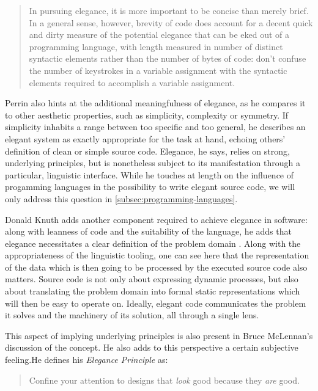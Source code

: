 \begin{quote}
  In pursuing elegance, it is more important to be concise than merely brief. In a general sense, however, brevity of code does account for a decent quick and dirty measure of the potential elegance that can be eked out of a programming language, with length measured in number of distinct syntactic elements rather than the number of bytes of code: don't confuse the number of keystrokes in a variable assignment with the syntactic elements required to accomplish a variable assignment. \citep{perrin_itlog_2006}
\end{quote}

Perrin also hints at the additional meaningfulness of elegance, as he compares it to other aesthetic properties, such as simplicity, complexity or symmetry. If simplicity inhabits a range between too specific and too general, he describes an elegant system as exactly appropriate for the task at hand, echoing others' definition of clean or simple source code. Elegance, he says, relies on strong, underlying principles, but is nonetheless subject to its manifestation through a particular, linguistic interface. While he touches at length on the influence of progamming languages in the possibility to write elegant source code, we will only address this question in \autoref{subsec:programming-languages}.

Donald Knuth adds another component required to achieve elegance in software: along with leanness of code and the suitability of the language, he adds that elegance necessitates a clear definition of the problem domain \citep{fuller_software_2008}. Along with the appropriateness of the linguistic tooling, one can see here that the representation of the data which is then going to be processed by the executed source code also matters. Source code is not only about expressing dynamic processes, but also about translating the problem domain into formal static representations which will then be easy to operate on. Ideally, elegant code communicates the problem it solves and the machinery of its solution, all through a single lens.

This aspect of implying underlying principles is also present in Bruce McLennan's discussion of the concept. He also adds to this perspective a certain subjective feeling.He defines his \emph{Elegance Principle} as:

\begin{quote}
  Confine your attention to designs that \emph{look} good because they \emph{are} good. \citep{mclennan_who_1997}
\end{quote}

